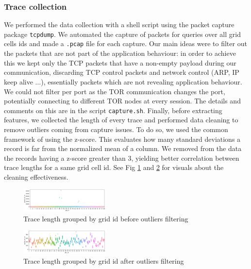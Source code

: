 \documentclass[10pt,conference,compsocconf]{IEEEtran}
\begin{document}
\subsubsection{Trace collection}
We performed the data collection with a shell script using the packet capture package \texttt{tcpdump}\cite{noauthor_tcpdump1_nodate}. We automated the capture of packets for queries over all grid cells ids and made a \texttt{.pcap} file for each capture. Our main ideas were to filter out the packets that are not part of the application behaviour: in order to achieve this we kept only the TCP packets that have a non-empty payload during our communication, discarding TCP control packets and network control (ARP, IP keep alive ...), essentially packets which are not revealing application behaviour. We could not filter per port as the TOR communication changes the port, potentially connecting to different TOR nodes at every session. The details and comments on this are in the script \texttt{capture.sh}. Finally, before extracting features, we collected the length of every trace and performed data cleaning to remove outliers coming from capture issues. To do so, we used the common framework of using the z-score. This evaluates how many standard deviations a record is far from the normalized mean of a column. We removed from the data the records having a z-score greater than 3, yielding better correlation between trace lengths for a same grid cell id. See Fig \ref{fig:lengths_before_cleaning} and \ref{fig:lengths_after_cleaning} for visuals about the cleaning effectiveness.
\begin{figure}
    \centering
    \includegraphics[width=0.4\textwidth]{output2.png}
    \caption{Trace length grouped by grid id before outliers filtering}
    \label{fig:lengths_before_cleaning}
\end{figure}
\begin{figure}
    \centering
    \includegraphics[width=0.4\textwidth]{output3.png}
    \caption{Trace length grouped by grid id after outliers filtering}
    \label{fig:lengths_after_cleaning}
\end{figure}
\end{document}
